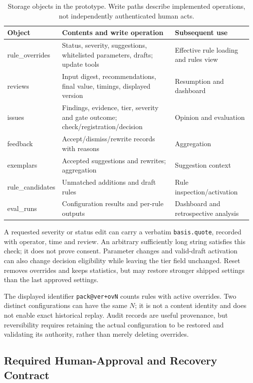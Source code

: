 \documentclass[computers,article,submit,moreauthors]{Definitions/mdpi}
\begin{document}
\begin{table}[!ht]
\caption{Storage objects in the prototype. Write paths describe implemented operations, not independently authenticated human acts.}
\label{tab:storage}
\centering\footnotesize
\begin{tabularx}{\textwidth}{@{}p{3cm}XX@{}}
\toprule
Object & Contents and write operation & Subsequent use \\
\midrule
rule\_overrides & Status, severity, suggestions, whitelisted parameters, drafts; update tools & Effective rule loading and rules view \\
reviews & Input digest, recommendations, final value, timings, displayed version & Resumption and dashboard \\
issues & Findings, evidence, tier, severity and gate outcome; check/registration/decision & Opinion and evaluation \\
feedback & Accept/dismiss/rewrite records with reasons & Aggregation \\
exemplars & Accepted suggestions and rewrites; aggregation & Suggestion context \\
rule\_candidates & Unmatched additions and draft rules & Rule inspection/activation \\
eval\_runs & Configuration results and per-rule outputs & Dashboard and retrospective analysis \\
\bottomrule
\end{tabularx}
\end{table}

A requested severity or status edit can carry a verbatim \texttt{basis.quote}, recorded with operator, time and review. An arbitrary sufficiently long string satisfies this check; it does not prove consent. Parameter changes and valid-draft activation can also change decision eligibility while leaving the tier field unchanged. Reset removes overrides and keeps statistics, but may restore stronger shipped settings than the last approved settings.

The displayed identifier \texttt{pack@ver+ovN} counts rules with active overrides. Two distinct configurations can have the same $N$; it is not a content identity and does not enable exact historical replay. Audit records are useful provenance, but reversibility requires retaining the actual configuration to be restored and validating its authority, rather than merely deleting overrides.

\subsection{Required Human-Approval and Recovery Contract}\label{sec:contract}
\end{document}

